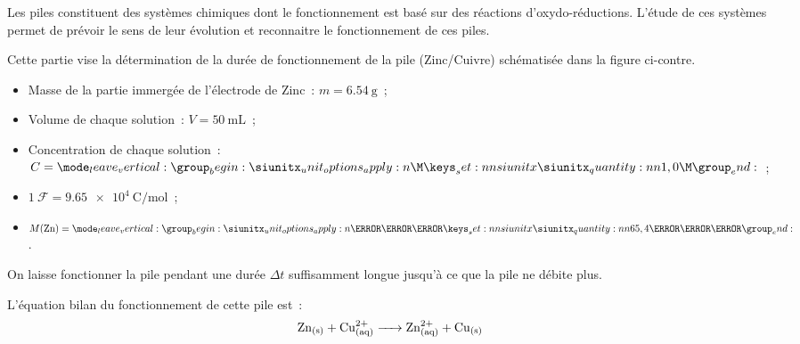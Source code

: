 Les piles constituent des systèmes chimiques dont le fonctionnement est basé sur
des réactions d'oxydo-réductions. L'étude de ces systèmes permet de prévoir le
sens de leur évolution et reconnaitre le fonctionnement de ces piles.

Cette partie vise la détermination de la durée de fonctionnement de la pile
(Zinc/Cuivre) schématisée dans la figure ci-contre.

\begin{minipage}{0.69\linewidth}
    \begin{donnees}
        \begin{itemize}
          \item Masse de la partie immergée de l'électrode de Zinc~:
                $m=\qty{6,54}{\gram}$~;
          \item Volume de chaque solution~: $V=\qty{50}{\mL}$~;
          \item Concentration de chaque solution~: $C=\qty{1,0}{\M}$~;
          \item $1~\mathcal{F}=\qty{9,65e4}{\coulomb\per\mole}$~;
          \item $M(\ce{Zn})=\qty{65,4}{\gram\per\mole}$.
        \end{itemize}
    \end{donnees}
    On laisse fonctionner la pile pendant une durée $\Delta t$ suffisamment longue
    jusqu'à ce que la pile ne débite plus.
    
    L'équation bilan du fonctionnement de cette pile est~:
    \[
        \ce{Zn_{(s)} + Cu^{2+}_{(aq)} -> Zn^{2+}_{(aq)} + Cu_{(s)}}
    \]
\end{minipage}
\hfill
